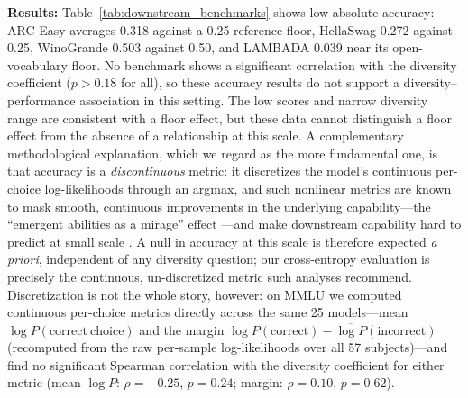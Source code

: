 \textbf{Results:}
Table~\ref{tab:downstream_benchmarks} shows low absolute accuracy: ARC-Easy averages 0.318 against a 0.25 reference floor, HellaSwag 0.272 against 0.25, WinoGrande 0.503 against 0.50, and LAMBADA 0.039 near its open-vocabulary floor.
No benchmark shows a significant correlation with the diversity coefficient ($p > 0.18$ for all), so these accuracy results do not support a diversity--performance association in this setting.
The low scores and narrow diversity range are consistent with a floor effect, but these data cannot distinguish a floor effect from the absence of a relationship at this scale.
A complementary methodological explanation, which we regard as the more fundamental one, is that accuracy is a \emph{discontinuous} metric: it discretizes the model's continuous per-choice log-likelihoods through an argmax, and such nonlinear metrics are known to mask smooth, continuous improvements in the underlying capability---the ``emergent abilities as a mirage'' effect \citep{schaeffer2023emergent}---and make downstream capability hard to predict at small scale \citep{schaeffer2024elusive}. A null in accuracy at this scale is therefore expected \emph{a priori}, independent of any diversity question; our cross-entropy evaluation is precisely the continuous, un-discretized metric such analyses recommend.
Discretization is not the whole story, however: on MMLU we computed continuous per-choice metrics directly across the same 25 models---mean $\log P(\mathrm{correct\ choice})$ and the margin $\log P(\mathrm{correct}) - \overline{\log P}(\mathrm{incorrect})$ (recomputed from the raw per-sample log-likelihoods over all 57 subjects)---and find no significant Spearman correlation with the diversity coefficient for either metric (mean $\log P$: $\rho=-0.25$, $p=0.24$; margin: $\rho=0.10$, $p=0.62$).

